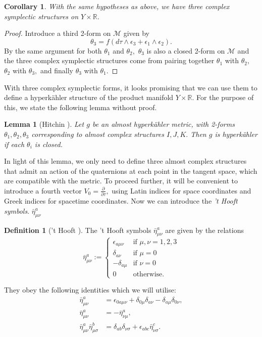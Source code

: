 \documentclass[a4paper,onecolumn,12pt]{article}
\newtheorem{lem}[thm]{Lemma}
\newtheorem{cor}[thm]{Corollary}
\theoremstyle{definition}
\newtheorem{defn}[thm]{Definition}
\theoremstyle{remark}
\newcommand{\m}{\mu}
\newcommand{\n}{\nu}
\newcommand{\e}{\epsilon}
\newcommand{\tta}[1]{\theta_{#1}}
\newcommand{\ddt}[1]{\frac{\partial #1}{\partial \tau}}
\newcommand{\HK}{hyperk\"ahler }
\newcommand{\R}{\mathbb{R}}
\newcommand{\hooft}[3]{\bar{\eta}^{#1}_{#2 #3}}
\begin{document}
\begin{cor}
	With the same hypotheses as above, we have three complex symplectic structures on $Y\times\R.$
\end{cor}
\begin{proof}
	Introduce a third 2-form on $\mathcal{M}$ given by
	\begin{equation*}
	\theta_{3} = f(d\tau \wedge \e_{3} +  \e_{1}\wedge \e_{2}).
	\end{equation*}
	By the same argument for both $\theta_{1}$ and $\theta_{2},$ $\theta_{3}$ is also a closed 2-form on $\mathcal{M}$ and the three complex symplectic structures come from pairing together $\theta_{1}$ with $\theta_{2},$ $\theta_{2}$ with $\theta_{3},$ and finally $\theta_{3}$ with $\theta_{1}.$
\end{proof}
With three complex symplectic forms, it looks promising that we can use them to define a \HK structure of the product manifold $Y\times\R.$ For the purpose of this, we state the following lemma without proof.\\
\begin{lem}[Hitchin \cite{Hitchin_1987}]
	\label{hitchin_lemma}
	Let $g$ be an almost \HK metric, with 2-forms $\tta{1},\tta{2},\tta{3}$ corresponding to almost complex structures $I,J,K.$ Then $g$ is \HK if each $\tta{i}$ is closed.
\end{lem}
In light of this lemma, we only need to define three almost complex structures that admit an action of the quaternions at each point in the tangent space, which are compatible with the metric. To proceed further, it will be convenient to introduce a fourth vector $V_{0} = \ddt{},$ using Latin indices for space coordinates and Greek indices for spacetime coordinates. Now we can introduce the \emph{'t Hooft symbols}. $\hooft{a}{\m}{\n}$\\
\begin{defn}['t Hooft \cite{thooft_1976}]
	The 't Hooft symbols $\hooft{a}{\m}{\n}$ are given by the relations
	\[
	\bar{\eta}^{a}_{\mu \nu}:= 
	\begin{cases}
	\epsilon_{a\mu\nu}& \text{if } \mu,\nu = 1,2,3\\
	\delta_{a\nu}& \text{if } \mu = 0\\
	-\delta_{a\mu}& \text{if } \nu = 0\\
	0& \text{otherwise.}
	\end{cases}
	\]
\end{defn}
They obey the following identities which we will utilise:
\begin{subequations}
	\begin{align}
	\label{thooft}
	\bar{\eta}^{a}_{\mu \nu} &= \epsilon_{0 a\mu\nu} + \delta_{0\mu}\delta_{a\nu} - \delta_{a\mu}\delta_{0\nu},\\
	\bar{\eta}^{a}_{\mu \nu} &= -\bar{\eta}^{a}_{\nu \mu},\\
	\bar{\eta}^{a}_{\mu \nu}\bar{\eta}^{b}_{\mu \sigma} &= \delta_{ab}\delta_{\nu\sigma} + \epsilon_{abc}\bar{\eta}^{c}_{\nu \sigma}.
	\end{align}
\end{subequations}
\end{document}
